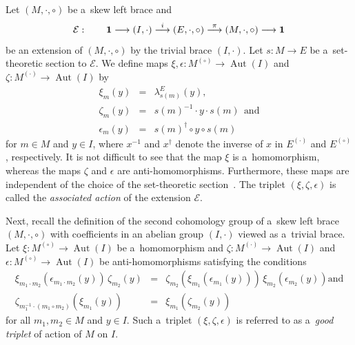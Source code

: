 \documentclass{jonasart}
\theoremstyle{plain}
\DeclareMathOperator{\Aut}{Aut}
\begin{document}
	Let $(M, \cdot, \circ)$ be a~skew left brace and
	\[
	\mathcal{E}: \quad \quad {\bf 1} \longrightarrow (I, \cdot) \stackrel{i}{\longrightarrow}  (E,\cdot,\circ) \stackrel{\pi}{\longrightarrow} (M,\cdot,\circ) \longrightarrow {\bf 1}
	\]
	be an extension of $(M, \cdot, \circ)$ by the trivial brace $(I, \cdot)$. Let $s: M \rightarrow E$ be a~set-theoretic section to $\mathcal{E}$. We define maps $\xi, 	\epsilon: M^{(\circ)} \rightarrow \Aut(I)$ and $\zeta:M^{(\cdot)} \rightarrow \Aut(I)$ by
	\begin{eqnarray}
		\xi_m (y) & = & \lambda^E_{s(m)}(y),\label{action1 sb}\\
		\zeta_m (y) & = & s(m)^{-1} \cdot y \cdot s(m)~\label{action2 sb}~\textrm{and}\\
		\epsilon_m (y) & = & s(m)^{\dagger} \circ y \circ s(m)\label{action3 sb}
	\end{eqnarray}
	for $m \in M$ and $y \in I$, where $x^{-1}$ and $x^\dagger$ denote the inverse of $x$ in $E^{(\cdot)}$ and $E^{(\circ)}$, respectively. It is not difficult to see that the map $\xi$ is a~homomorphism, whereas the maps $\zeta$ and $\epsilon $ are anti-homomorphisms. Furthermore, these maps are independent of the choice of the set-theoretic section~\cite[Proposition 3.4]{MR4604853}. The triplet $(\xi, \zeta, \epsilon)$ is called the \emph{associated action} of the extension $\mathcal{E}$.
	
	Next, recall the definition of the second cohomology group of a~skew left brace $(M, \cdot, \circ)$ with coefficients in an abelian group $(I, \cdot)$ viewed as a~trivial brace. Let $\xi: M ^{(\circ)} \rightarrow \Aut (I)$ be a~homomorphism and $\zeta: M^{(\cdot)} \rightarrow \Aut(I)$ and $\epsilon: M^{(\circ)} \rightarrow \Aut(I)$ be anti-homo\-morphisms satisfying the conditions
	\begin{eqnarray*}
		\xi_{m_1 \cdot m_2}(\epsilon_{m_1 \cdot m_2}(y)) \,\zeta_{m_2}(y) & = & \zeta_{m_2}(\xi_{ m_1 }(\epsilon_{m_1}(y))) \, \xi_{ m_2} (\epsilon_{m_2}(y)) \textrm{and}\\
		\zeta_{m^{-1}_1 \cdot (m_1 \circ m_2 )}(\xi_{m_1}(y)) & =& \xi_{m_1}(\zeta_{m_2}(y))
	\end{eqnarray*}
	for all $m_1, m_2 \in M$ and $y \in I$. Such a~triplet $(\xi, \zeta, \epsilon)$ is referred to as a~\emph{good triplet} of action of $M$ on $I$.
	
\end{document}
